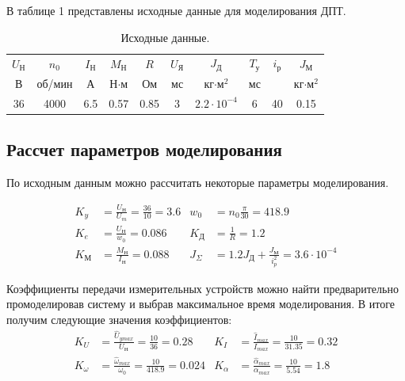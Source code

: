 \documentclass[a4paper, 12pt]{article}
\begin{document}
В таблице 1 представлены исходные данные для моделирования ДПТ.
\begin{table}[h!]
    \centering
    \begin{threeparttable}
        \caption{Исходные данные.}
        \begin{tabular}{|c|c|c|c|c|c|c|c|c|c|}
            \hline
            $U_\text{Н}$ & $n_0$ & $I_\text{Н}$ & $M_\text{Н}$ & $R$ & $U_\text{Я}$ & $J_\text{Д}$ & $T_\text{у}$ & $i_\text{р}$ & $J_\text{М}$\\
            В & об/мин & А & Н$\cdot$м & Ом & мс & кг$\cdot\text{м}^2$ & мс & &  кг$\cdot\text{м}^2$ \\ \hline
            36 & 4000 & 6.5 & 0.57 & 0.85 & 3 & $2.2\cdot10^{-4}$ & 6 & 40 & 0.15 \\
            \hline
        \end{tabular}
    \end{threeparttable}
\end{table}

\newpage
\begin{center}
\section{Рассчет параметров моделирования}
\end{center}

По исходным данным можно рассчитать некоторые параметры моделирования.\par
\begin{align*}
    K_y & = \frac{U_\text{Н}}{U_m} = \frac{36}{10} = 3.6 & w_0 & = n_0\frac{\pi}{30} = 418.9 \\
    K_e & = \frac{U_\text{Н}}{w_0} = 0.086 & K_\text{Д} & = \frac{1}{R} = 1.2 \\
    K_\text{М} & = \frac{M_\text{Н}}{I_\text{Н}} =  0.088 & J_{\Sigma} & = 1.2J_\text{Д} + \frac{J_\text{М}}{i^2_p} = 3.6 \cdot 10^{-4}
\end{align*} \par
Коэффициенты передачи измерительных устройств можно найти предварительно промоделировав систему и выбрав максимальное время моделирования. В итоге получим следующие значения коэффициентов: 
\begin{align*}
    K_U & = \frac{\hat{U}_{ymax}}{U_\text{Н}} = \frac{10}{36} = 0.28  & K_I & = \frac{\hat{I}_{max}}{I_{max}} = \frac{10}{31.35} =  0.32\\
    K_\omega & = \frac{\hat{\omega}_{max}}{\omega_0} = \frac{10}{418.9} = 0.024 & K_\alpha & = \frac{\hat{\alpha}_{max}}{\alpha_{max}} = \frac{10}{5.54} = 1.8
\end{align*}
\end{document}
